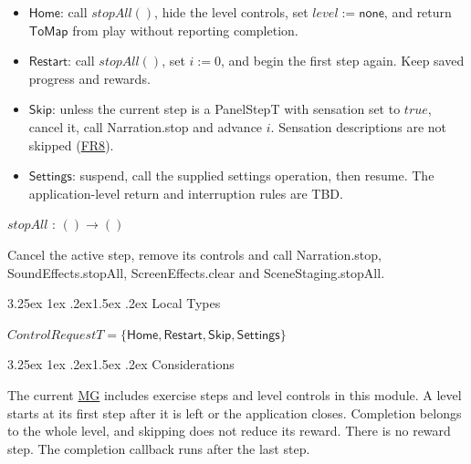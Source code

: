 \documentclass[10pt, titlepage]{article}
\makeatletter
\newcommand{\srsurl}{https://team-hindsight.github.io/ophthamology-game/SRS/SRS.pdf}
\newcommand{\srsitemref}[2]{\href{\srsurl\#nameddest=#1}{#2}}
\newcommand{\mgurl}{https://github.com/team-hindsight/ophthamology-game/blob/main/pdfs/Design/SoftArchitecture/MG.pdf}
\newcommand{\mg}{\href{\mgurl}{MG}}
\renewcommand\paragraph{\@startsection{paragraph}{4}{\z@}%
  {3.25ex \@plus 1ex \@minus .2ex}{1.5ex \@plus .2ex}%
  {\normalfont\normalsize\bfseries}}
\newcommand{\T}[1]{\mathit{#1}}          %
\newcommand{\V}[1]{\mathsf{#1}}          %
\newcommand{\true}{\mathit{true}}
\makeatother
\begin{document}
\begin{itemize}
\item $\V{Home}$: call $\T{stopAll}()$, hide the level controls,
  set $\T{level} := \V{none}$, and return $\V{ToMap}$ from play
  without reporting completion.
\item $\V{Restart}$: call $\T{stopAll}()$, set $i := 0$, and
  begin the first step again. Keep saved progress and rewards.
\item $\V{Skip}$: unless the current step is a PanelStepT with
  sensation set to $\true$, cancel it, call Narration.stop and
  advance $i$. Sensation
  descriptions are not skipped (\srsitemref{FR_DescribeSensations}{FR8}).
\item $\V{Settings}$: suspend, call the supplied settings operation,
  then resume. The application-level return and interruption rules
  are TBD.
\end{itemize}

\noindent $\T{stopAll}$ : $() \to ()$

Cancel the active step, remove its controls and call Narration.stop,
SoundEffects.stopAll, ScreenEffects.clear and SceneStaging.stopAll.

\paragraph{Local Types}

$\T{ControlRequestT} = \{\V{Home}, \V{Restart}, \V{Skip}, \V{Settings}\}$

\paragraph{Considerations}

The current \mg{} includes exercise steps and level controls in this module.
A level starts at its first step after it is left or the application
closes. Completion belongs to the whole level, and skipping does not
reduce its reward. There is no reward step. The completion callback runs
after the last step.
\end{document}
